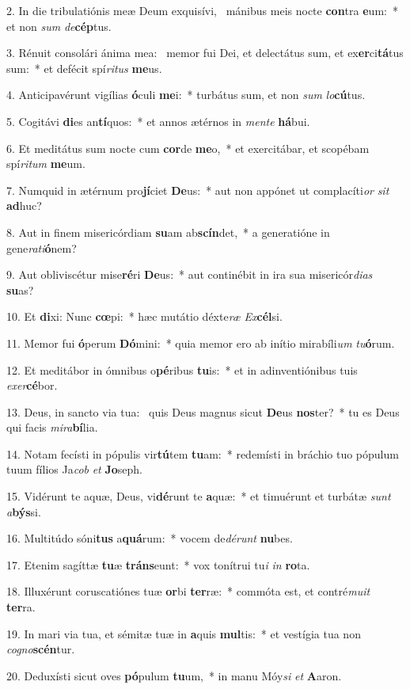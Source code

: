 2. In die tribulatiónis meæ Deum exquisívi, \dag\  mánibus meis nocte \textbf{con}tra \textbf{e}um:~*  et non \textit{sum} \textit{de}\textbf{cép}tus.\

3. Rénuit consolári ánima mea: \dag\  memor fui Dei, et delectátus sum, et ex\textbf{er}ci\textbf{tá}tus sum:~*  et defécit spí\textit{ri}\textit{tus} \textbf{me}us.\

4. Anticipavérunt vigílias \textbf{ó}culi \textbf{me}i:~*  turbátus sum, et non \textit{sum} \textit{lo}\textbf{cú}tus.\

5. Cogitávi \textbf{di}es an\textbf{tí}quos:~*  et annos ætérnos in \textit{men}\textit{te} \textbf{há}bui.\

6. Et meditátus sum nocte cum \textbf{cor}de \textbf{me}o,~*  et exercitábar, et scopébam spí\textit{ri}\textit{tum} \textbf{me}um.\

7. Numquid in ætérnum pro\textbf{jí}ciet \textbf{De}us:~*  aut non appónet ut complacíti\textit{or} \textit{sit} \textbf{ad}huc?\

8. Aut in finem misericórdiam \textbf{su}am ab\textbf{scín}det,~*  a generatióne in gene\textit{ra}\textit{ti}\textbf{ó}nem?\

9. Aut obliviscétur mise\textbf{ré}ri \textbf{De}us:~*  aut continébit in ira sua misericór\textit{di}\textit{as} \textbf{su}as?\

10. Et \textbf{di}xi: Nunc \textbf{cœ}pi:~*  hæc mutátio déxte\textit{ræ} \textit{Ex}\textbf{cél}si.\

11. Memor fui \textbf{ó}perum \textbf{Dó}mini:~*  quia memor ero ab inítio mirabíli\textit{um} \textit{tu}\textbf{ó}rum.\

12. Et meditábor in ómnibus o\textbf{pé}ribus \textbf{tu}is:~*  et in adinventiónibus tuis \textit{ex}\textit{er}\textbf{cé}bor.\

13. Deus, in sancto via tua: \dag\  quis Deus magnus sicut \textbf{De}us \textbf{nos}ter?~*  tu es Deus qui facis \textit{mi}\textit{ra}\textbf{bí}lia.\

14. Notam fecísti in pópulis vir\textbf{tú}tem \textbf{tu}am:~*  redemísti in bráchio tuo pópulum tuum fílios Ja\textit{cob} \textit{et} \textbf{Jo}seph.\

15. Vidérunt te aquæ, Deus, vi\textbf{dé}runt te \textbf{a}quæ:~*  et timuérunt et turbátæ \textit{sunt} \textit{a}\textbf{býs}si.\

16. Multitúdo sóni\textbf{tus} a\textbf{quá}rum:~*  vocem de\textit{dé}\textit{runt} \textbf{nu}bes.\

17. Etenim sagíttæ \textbf{tu}æ \textbf{tráns}eunt:~*  vox tonítrui tu\textit{i} \textit{in} \textbf{ro}ta.\

18. Illuxérunt coruscatiónes tuæ \textbf{or}bi \textbf{ter}ræ:~*  commóta est, et contré\textit{mu}\textit{it} \textbf{ter}ra.\

19. In mari via tua, et sémitæ tuæ in \textbf{a}quis \textbf{mul}tis:~*  et vestígia tua non \textit{co}\textit{gno}\textbf{scén}tur.\

20. Deduxísti sicut oves \textbf{pó}pulum \textbf{tu}um,~*  in manu Móy\textit{si} \textit{et} \textbf{A}aron.\

